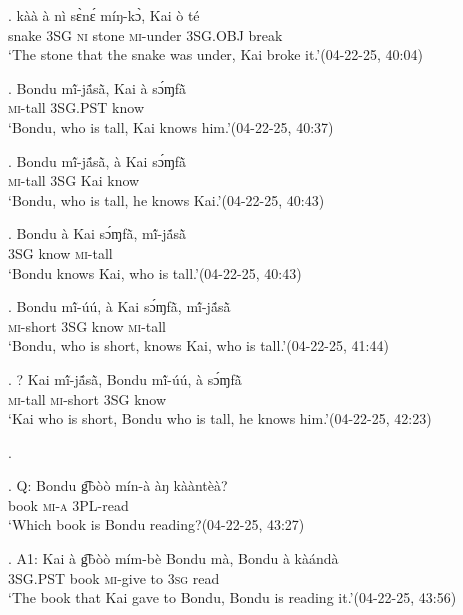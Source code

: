 \documentclass{assets/fieldnotes}
\begin{document}
\exg. kàà à nì sɛ̀nɛ́ míŋ-kɔ̀, Kai ò té\\
snake \textsc{3SG} \textsc{ni} stone \textsc{mi}-under {} \textsc{3SG.OBJ} break\\
`The stone that the snake was under, Kai broke it.’\hfill{(04-22-25, 40:04)}


\exg. Bondu mĩ́-jã́sã̀, Kai à sɔ́ɱfã̀\\
{} \textsc{mi}-tall {} \textsc{3SG.PST} know\\
`Bondu, who is tall, Kai knows him.’\hfill{(04-22-25, 40:37)}

\exg. Bondu mĩ́-jã́sã̀, à Kai sɔ́ɱfã̀\\
{} \textsc{mi}-tall \textsc{3SG} {Kai} know\\
`Bondu, who is tall, he knows Kai.’\hfill{(04-22-25, 40:43)}

\exg. Bondu à Kai sɔ́ɱfã̀, mĩ́-jã́sã̀\\
{} \textsc{3SG} {} know \textsc{mi}-tall\\
`Bondu knows Kai, who is tall.’\hfill{(04-22-25, 40:43)}

\exg. Bondu mĩ́-úú, à Kai sɔ́ɱfã̀, mĩ́-jã́sã̀\\
{} \textsc{mi}-short \textsc{3SG} {} know \textsc{mi}-tall\\
`Bondu, who is short, knows Kai, who is tall.’\hfill{(04-22-25, 41:44)}

 \exg. ? Kai mĩ́-jã́sã̀, Bondu mĩ́-úú, à sɔ́ɱfã̀\\
{} \textsc{mi}-tall {} \textsc{mi}-short \textsc{3SG} know\\
`Kai who is short, Bondu who is tall, he knows him.’\hfill{(04-22-25, 42:23)}\\


\exg.

\ag. Q: Bondu g͡bòò mín-à àŋ kààntèà?\\
{} {} book \textsc{mi-a} \textsc{3PL}-read\\
`Which book is Bondu reading?\hfill{(04-22-25, 43:27)}

\bg. A1: Kai à g͡bòò mím-bè Bondu mà, Bondu à kàándà\\
{} {} \textsc{3SG.PST} book \textsc{mi}-give {} to {} \textsc{3sg} read\\
`The book that Kai gave to Bondu, Bondu is reading it.’\hfill{(04-22-25, 43:56)}
\end{document}
